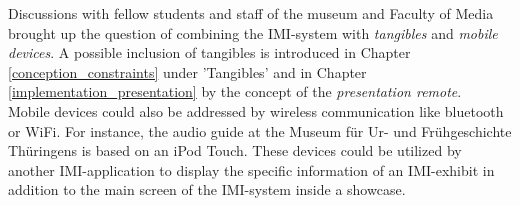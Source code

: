 Discussions with fellow students and staff of the museum and Faculty of Media brought up the question of combining the \ac{IMI}-system with \textit{tangibles} and \textit{mobile devices}. A possible inclusion of tangibles is introduced in Chapter \ref{conception_constraints} under 'Tangibles' and in Chapter \ref{implementation_presentation} by the concept of the \textit{presentation remote}.
\\
Mobile devices could also be addressed by wireless communication like bluetooth or WiFi. For instance, the audio guide at the Museum für Ur- und Frühgeschichte Thüringens is based on an iPod Touch. These devices could be utilized by another \ac{IMI}-application to display the specific information of an \ac{IMI}-exhibit in addition to the main screen of the \ac{IMI}-system inside a showcase.

